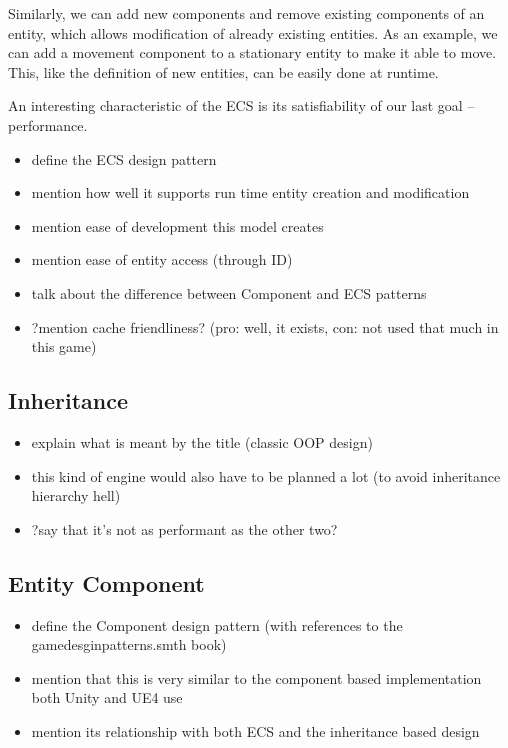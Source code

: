 Similarly, we can add new components and remove existing components of an entity, which allows modification of already existing
entities. As an example, we can add a movement component to a stationary entity to make it able to move. This, like the definition
of new entities, can be easily done at runtime.

An interesting characteristic of the ECS is its satisfiability of our last goal -- performance.

\begin{itemize}
    \item define the ECS design pattern
    \item mention how well it supports run time entity creation and modification
    \item mention ease of development this model creates
    \item mention ease of entity access (through ID)
    \item talk about the difference between Component and ECS patterns
    \item ?mention cache friendliness? (pro: well, it exists, con: not used that
        much in this game)
\end{itemize}

\subsection{Inheritance}

\begin{itemize}
    \item explain what is meant by the title (classic OOP design)
    \item this kind of engine would also have to be planned a lot (to avoid
        inheritance hierarchy hell)
    \item ?say that it's not as performant as the other two?
\end{itemize}

\subsection{Entity Component}

\begin{itemize}
    \item define the Component design pattern (with references to
         the gamedesginpatterns.smth book)
    \item mention that this is very similar to the component based implementation
         both Unity and UE4 use
    \item mention its relationship with both ECS and the inheritance based design
\end{itemize}

